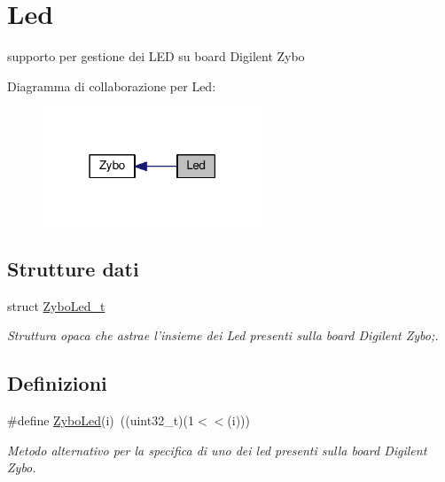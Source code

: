 \hypertarget{group___led}{\section{Led}
\label{group___led}
}


supporto per gestione dei L\+E\+D su board Digilent Zybo  


Diagramma di collaborazione per Led\+:\nopagebreak
\begin{figure}[H]
\begin{center}
\leavevmode
\includegraphics[width=186pt]{group___led}
\end{center}
\end{figure}
\subsection*{Strutture dati}
\begin{DoxyCompactItemize}
\item 
struct \hyperlink{struct_zybo_led__t}{Zybo\+Led\+\_\+t}
\begin{DoxyCompactList}\small\item\em Struttura opaca che astrae l'insieme dei Led presenti sulla board Digilent Zybo;. \end{DoxyCompactList}\end{DoxyCompactItemize}
\subsection*{Definizioni}
\begin{DoxyCompactItemize}
\item 
\#define \hyperlink{group___led_ga50ab39fed34dc3aaf53cdfd67d8ba25d}{Zybo\+Led}(i)~((uint32\+\_\+t)(1$<$$<$(i)))
\begin{DoxyCompactList}\small\item\em Metodo alternativo per la specifica di uno dei led presenti sulla board Digilent Zybo. \end{DoxyCompactList}\end{DoxyCompactItemize}
